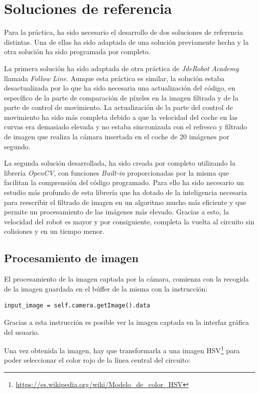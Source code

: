 \section{Soluciones de referencia}
Para la práctica, ha sido necesario el desarrollo de dos soluciones de referencia distintas. Una de ellas ha sido adaptada de una solución previamente hecha y la otra solución ha sido programada por completo.

La primera solución ha sido adaptada de otra práctica de \textit{JdeRobot Academy} llamada \textit{Follow Line}. Aunque esta práctica es similar, la solución estaba desactualizada por lo que ha sido necesaria una actualización del código, en específico de la parte de comparación de píxeles en la imagen filtrada y de la parte de control de movimiento. La actualización de la parte del control de movimiento ha sido más completa debido a que la velocidad del coche en las curvas era demasiado elevada y no estaba sincronizada con el refresco y filtrado de imagen que realiza la cámara insertada en el coche de 20 imágenes por segundo.

La segunda solución desarrollada, ha sido creada por completo utilizando la librería \textit{OpenCV}, con funciones \textit{Built-in} proporcionadas por la misma que facilitan la comprensión del código programado. Para ello ha sido necesario un estudio más profundo de esta librería que ha dotado de la inteligencia necesaria para reescribir el filtrado de imagen en un algoritmo mucho más eficiente y que permite un procesamiento de las imágenes más elevado. Gracias a esto, la velocidad del robot es mayor y por consiguiente, completa la vuelta al circuito sin colisiones y en un tiempo menor.

\subsection{Procesamiento de imagen} \label{sec.pdi}
El procesamiento de la imagen captada por la cámara, comienza con la recogida de la imagen guardada en el búffer de la misma con la instrucción:

\lstset{language=Python, breaklines=true, basicstyle=\footnotesize}
\begin{lstlisting}[frame=single]
input_image = self.camera.getImage().data
\end{lstlisting}

Gracias a esta instrucción es posible ver la imagen captada en la interfaz gráfica del usuario.

Una vez obtenida la imagen, hay que transformarla a una imagen HSV\footnote{\url{https://es.wikipedia.org/wiki/Modelo_de_color_HSV}} para poder seleccionar el color rojo de la línea central del circuito:

